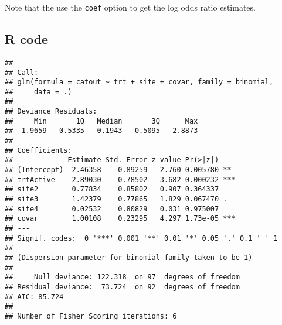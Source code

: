 \documentclass[]{book}
\newenvironment{Shaded}{\begin{snugshade}}{\end{snugshade}}
\newcommand{\DataTypeTok}[1]{\textcolor[rgb]{0.13,0.29,0.53}{#1}}
\newcommand{\DecValTok}[1]{\textcolor[rgb]{0.00,0.00,0.81}{#1}}
\newcommand{\KeywordTok}[1]{\textcolor[rgb]{0.13,0.29,0.53}{\textbf{#1}}}
\newcommand{\NormalTok}[1]{#1}
\newcommand{\OperatorTok}[1]{\textcolor[rgb]{0.81,0.36,0.00}{\textbf{#1}}}
\newcommand{\StringTok}[1]{\textcolor[rgb]{0.31,0.60,0.02}{#1}}
\begin{document}
Note that the use the \texttt{coef} option to get the log odds ratio estimates.

\hypertarget{r-code-1}{%
\subsection{R code}\label{r-code-1}}

\begin{Shaded}
\end{Shaded}

\begin{verbatim}
## 
## Call:
## glm(formula = catout ~ trt + site + covar, family = binomial, 
##     data = .)
## 
## Deviance Residuals: 
##     Min       1Q   Median       3Q      Max  
## -1.9659  -0.5335   0.1943   0.5095   2.8873  
## 
## Coefficients:
##             Estimate Std. Error z value Pr(>|z|)    
## (Intercept) -2.46358    0.89259  -2.760 0.005780 ** 
## trtActive   -2.89030    0.78502  -3.682 0.000232 ***
## site2        0.77834    0.85802   0.907 0.364337    
## site3        1.42379    0.77865   1.829 0.067470 .  
## site4        0.02532    0.80829   0.031 0.975007    
## covar        1.00108    0.23295   4.297 1.73e-05 ***
## ---
## Signif. codes:  0 '***' 0.001 '**' 0.01 '*' 0.05 '.' 0.1 ' ' 1
## 
## (Dispersion parameter for binomial family taken to be 1)
## 
##     Null deviance: 122.318  on 97  degrees of freedom
## Residual deviance:  73.724  on 92  degrees of freedom
## AIC: 85.724
## 
## Number of Fisher Scoring iterations: 6
\end{verbatim}
\end{document}
